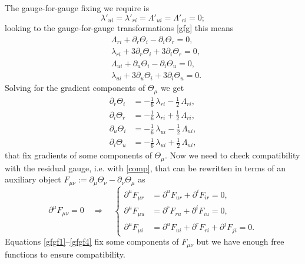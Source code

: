 \documentclass[a4paper,12pt]{article}
\begin{document}
The gauge-for-gauge fixing we require is
\begin{equation}
\lambda'_{ui}=\lambda'_{ri}=\Lambda'_{ui}=\Lambda'_{ri}=0;
\end{equation}
looking to the gauge-for-gauge transformations \eqref{gfg} this means
\begin{equation}
\begin{aligned}
    &\Lambda_{r i}+\partial_{r}\Theta_{i}-\partial_{i}\Theta_{r}=0,\\
&\lambda_{ri}+3\partial_{r}\Theta_{i}+3\partial_{i}\Theta_{r}=0,\\
      &\Lambda_{u i}+\partial_{u}\Theta_{i}-\partial_{i}\Theta_{u}=0,\\
&\lambda_{ui}+3\partial_{u}\Theta_{i}+3\partial_{i}\Theta_{u}=0.
\end{aligned}    
\end{equation}
Solving for the gradient components of $\Theta_{\mu}$ we get 
\begin{align}
\partial_r\Theta_i &= -\frac16\,\lambda_{ri}-\frac12\,\Lambda_{ri},
\label{gfgf1}\\
\partial_i\Theta_r &= -\frac16\,\lambda_{ri}+\frac12\,\Lambda_{ri}, \\
\partial_u\Theta_i &= -\frac16\,\lambda_{ui}-\frac12\,\Lambda_{ui}, \\
\partial_i\Theta_u &= -\frac16\,\lambda_{ui}+\frac12\,\Lambda_{ui} ,
\label{gfgf4}
\end{align}
that fix gradients of some components of $\Theta_{\mu}$.
Now we need to check compatibility with the residual gauge, i.e. with \eqref{comp}, that can be rewritten in terms of an auxiliary object $F_{\mu \nu}:= \partial_{\mu}\Theta_{\nu}-\partial_{\nu}\Theta_{\mu}$ as 
\begin{equation}
    \partial^{\mu}F_{\mu \nu}=0 \quad \Rightarrow \quad \begin{cases}

\partial^\mu F_{\mu r} &= \partial^u F_{u r}+\partial^i F_{i r}=0,\\
\partial^\mu F_{\mu u} &= \partial^r F_{r u}+\partial^i F_{i u}=0,\\
\partial^\mu F_{\mu i} &= \partial^u F_{u i}+\partial^r F_{r i}+\partial^j F_{j i}=0.
    \end{cases}
\end{equation}
Equations \eqref{gfgf1}--\eqref{gfgf4} fix some components of $F_{\mu \nu}$ but we have enough free functions to ensure compatibility. 
\end{document}
